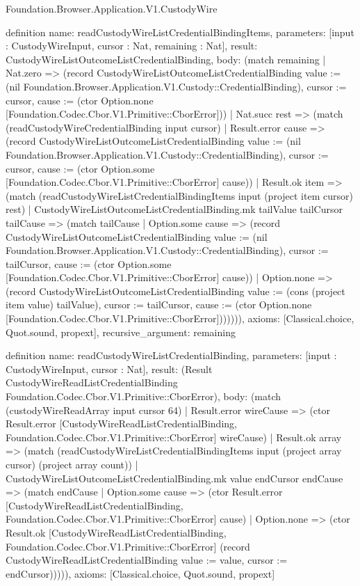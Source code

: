 \begin{lexlean}{Foundation.Browser.Application.V1.CustodyWire}
\begin{semanticmodule}
definition{
  name: readCustodyWireListCredentialBindingItems,
  parameters: [input : CustodyWireInput, cursor : Nat, remaining : Nat],
  result: CustodyWireListOutcomeListCredentialBinding,
  body: (match remaining
    | Nat.zero => (record CustodyWireListOutcomeListCredentialBinding {value := (nil Foundation.Browser.Application.V1.Custody::CredentialBinding), cursor := cursor, cause := (ctor Option.none [Foundation.Codec.Cbor.V1.Primitive::CborError])})
    | Nat.succ rest => (match (readCustodyWireCredentialBinding input cursor)
      | Result.error cause => (record CustodyWireListOutcomeListCredentialBinding {value := (nil Foundation.Browser.Application.V1.Custody::CredentialBinding), cursor := cursor, cause := (ctor Option.some [Foundation.Codec.Cbor.V1.Primitive::CborError] cause)})
      | Result.ok item => (match (readCustodyWireListCredentialBindingItems input (project item cursor) rest)
        | CustodyWireListOutcomeListCredentialBinding.mk tailValue tailCursor tailCause => (match tailCause
          | Option.some cause => (record CustodyWireListOutcomeListCredentialBinding {value := (nil Foundation.Browser.Application.V1.Custody::CredentialBinding), cursor := tailCursor, cause := (ctor Option.some [Foundation.Codec.Cbor.V1.Primitive::CborError] cause)})
          | Option.none => (record CustodyWireListOutcomeListCredentialBinding {value := (cons (project item value) tailValue), cursor := tailCursor, cause := (ctor Option.none [Foundation.Codec.Cbor.V1.Primitive::CborError])}))))),
  axioms: [Classical.choice, Quot.sound, propext],
  recursive_argument: remaining
}

definition{
  name: readCustodyWireListCredentialBinding,
  parameters: [input : CustodyWireInput, cursor : Nat],
  result: (Result CustodyWireReadListCredentialBinding Foundation.Codec.Cbor.V1.Primitive::CborError),
  body: (match (custodyWireReadArray input cursor 64)
    | Result.error wireCause => (ctor Result.error [CustodyWireReadListCredentialBinding, Foundation.Codec.Cbor.V1.Primitive::CborError] wireCause)
    | Result.ok array => (match (readCustodyWireListCredentialBindingItems input (project array cursor) (project array count))
      | CustodyWireListOutcomeListCredentialBinding.mk value endCursor endCause => (match endCause
        | Option.some cause => (ctor Result.error [CustodyWireReadListCredentialBinding, Foundation.Codec.Cbor.V1.Primitive::CborError] cause)
        | Option.none => (ctor Result.ok [CustodyWireReadListCredentialBinding, Foundation.Codec.Cbor.V1.Primitive::CborError] (record CustodyWireReadListCredentialBinding {value := value, cursor := endCursor}))))),
  axioms: [Classical.choice, Quot.sound, propext]
}


\end{semanticmodule}
\end{lexlean}
